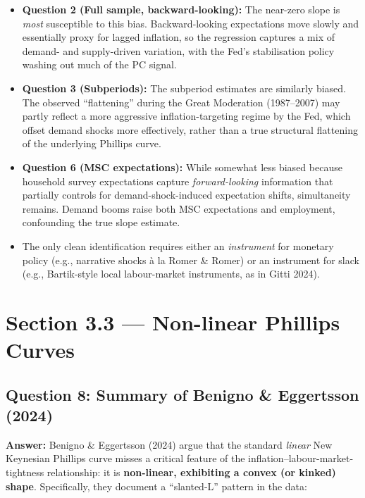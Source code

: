 \documentclass[
  12pt,
]{article}
\providecommand{\tightlist}{%
  \setlength{\itemsep}{0pt}\setlength{\parskip}{0pt}}
\begin{document}
\begin{itemize}
\tightlist
\item
  \textbf{Question 2 (Full sample, backward-looking):} The near-zero
  slope is \emph{most} susceptible to this bias. Backward-looking
  expectations move slowly and essentially proxy for lagged inflation,
  so the regression captures a mix of demand- and supply-driven
  variation, with the Fed's stabilisation policy washing out much of the
  PC signal.
\item
  \textbf{Question 3 (Subperiods):} The subperiod estimates are
  similarly biased. The observed ``flattening'' during the Great
  Moderation (1987--2007) may partly reflect a more aggressive
  inflation-targeting regime by the Fed, which offset demand shocks more
  effectively, rather than a true structural flattening of the
  underlying Phillips curve.
\item
  \textbf{Question 6 (MSC expectations):} While somewhat less biased
  because household survey expectations capture \emph{forward-looking}
  information that partially controls for demand-shock-induced
  expectation shifts, simultaneity remains. Demand booms raise both MSC
  expectations and employment, confounding the true slope estimate.
\item
  The only clean identification requires either an \emph{instrument} for
  monetary policy (e.g., narrative shocks à la Romer \& Romer) or an
  instrument for slack (e.g., Bartik-style local labour-market
  instruments, as in Gitti 2024).
\end{itemize}

\newpage

\hypertarget{section-3.3-non-linear-phillips-curves}{%
\section{Section 3.3 --- Non-linear Phillips
Curves}\label{section-3.3-non-linear-phillips-curves}}

\hypertarget{question-8-summary-of-benigno-eggertsson-2024}{%
\subsection{Question 8: Summary of Benigno \& Eggertsson
(2024)}\label{question-8-summary-of-benigno-eggertsson-2024}}

\textbf{Answer:} Benigno \& Eggertsson (2024) argue that the standard
\emph{linear} New Keynesian Phillips curve misses a critical feature of
the inflation--labour-market-tightness relationship: it is
\textbf{non-linear, exhibiting a convex (or kinked) shape}.
Specifically, they document a ``slanted-L'' pattern in the data:
\end{document}
